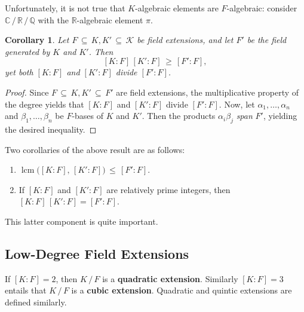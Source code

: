 \documentclass[11pt]{article}
\newtheorem{corollary}{Corollary}
\begin{document}
Unfortunately, it is not true that $K$-algebraic elements are $F$-algebraic: consider $\mathbb{C} \, / \, \mathbb{R} \, / \, \mathbb{Q}$ with the $\mathbb{R}$-algebraic element $\pi$.

\begin{adjustwidth}{0.5cm}{}
  \begin{corollary}
    Let $F \, \subseteq \, K, K' \, \subseteq \, \mathcal{K}$ be field extensions, and let $F'$ be the field generated by $K$ and $K'$. Then
    \[
      [K : F] \, [K' : F] \, \ge \, [F' : F],
    \]
    yet both $[K : F]$ and $[K' : F]$ divide $[F' : F]$.
  \end{corollary}
  \begin{proof}
    Since $F \, \subseteq \, K, K' \, \subseteq \, F'$ are field extensions, the multiplicative property of the degree yields that $[K : F]$ and $[K' : F]$ divide $[F' : F]$. Now, let $\alpha_{1}, \ldots, \alpha_{n}$ and $\beta_{1}, \ldots, \beta_{n}$ be $F$-bases of $K$ and $K'$. Then the products $\alpha_{i} \beta_{j}$ \textit{span} $F'$, yielding the desired inequality.
  \end{proof}
\end{adjustwidth}
Two corollaries of the above result are as follows:
\begin{enumerate}
  \item $\operatorname{lcm}\big( [K : F], \, [K' : F] \big) \, \le \, [F' : F]$.
  \item If $[K : F]$ and $[K' : F]$ are relatively prime integers, then $[K : F] \, [K' : F] = [F' : F]$.
\end{enumerate}
This latter component is quite important.


\subsection{Low-Degree Field Extensions}

If $[K : F] = 2$, then $K \, / \, F$ is a \textbf{quadratic extension}. Similarly $[K : F] = 3$ entails that $K \, / \, F$ is a \textbf{cubic extension}. Quadratic and quintic extensions are defined similarly.
\end{document}
